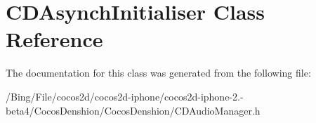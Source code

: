 \hypertarget{interface_c_d_asynch_initialiser}{\section{C\-D\-Asynch\-Initialiser Class Reference}
\label{interface_c_d_asynch_initialiser}
}


The documentation for this class was generated from the following file\-:\begin{DoxyCompactItemize}
\item 
/\-Bing/\-File/cocos2d/cocos2d-\/iphone/cocos2d-\/iphone-\/2.-\/beta4/\-Cocos\-Denshion/\-Cocos\-Denshion/C\-D\-Audio\-Manager.\-h\end{DoxyCompactItemize}
